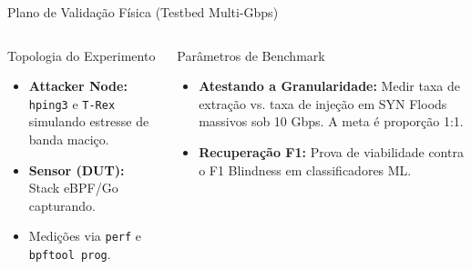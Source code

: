 \documentclass[aspectratio=169, 10pt]{beamer}
\begin{document}
\begin{frame}{Plano de Validação Física (Testbed Multi-Gbps)}
  \begin{columns}[T]
      \begin{block}{Topologia do Experimento}
        \begin{itemize}
          \item \textbf{Attacker Node:} \texttt{hping3} e \texttt{T-Rex} simulando estresse de banda maciço.
          \item \textbf{Sensor (DUT):} Stack eBPF/Go capturando.
          \item Medições via \texttt{perf} e \texttt{bpftool prog}.
        \end{itemize}
      \end{block}

      \begin{block}{Parâmetros de Benchmark}
        \begin{itemize}
          \item \textbf{Atestando a Granularidade:} Medir taxa de extração vs. taxa de injeção em SYN Floods massivos sob 10 Gbps. A meta é proporção 1:1.
          \item \textbf{Recuperação F1:} Prova de viabilidade contra o F1 Blindness em classificadores ML.
        \end{itemize}
      \end{block}
  \end{columns}
\end{frame}
\end{document}
